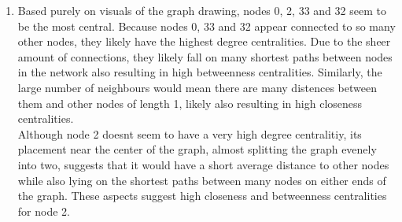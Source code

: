 \documentclass{article}
\begin{document}
\begin{enumerate}[label=(\alph*), left=10pt, itemsep=10pt]
\begin{minipage}[t]{0.9\textwidth}
\begin{minipage}[t]{0.9\textwidth}
            \end{minipage}
        \end{minipage}
        \newpage
        \item \begin{minipage}[t]{0.9\textwidth}
            Based purely on visuals of the graph drawing, nodes 0, 2, 33 and 32 seem to be the most
            central. Because nodes 0, 33 and 32 appear connected to so many other nodes, they likely
            have the highest degree centralities. Due to the sheer amount of connections, they likely
            fall on many shortest paths between nodes in the network also resulting in high betweenness centralities.
            Similarly, the large number of neighbours would mean there are many distences between them and other nodes
            of length 1, likely also resulting in high closeness centralities.\\
            Although node 2 doesnt seem to have a very high degree centralitiy, its placement near the center of the
            graph, almost splitting the graph evenely into two, suggests that it would have a short average distance
            to other nodes while also lying on the shortest paths between many nodes on either ends of the graph.
            These aspects suggest high closeness and betweenness centralities for node 2.
        \end{minipage}


\end{enumerate}
\end{document}
